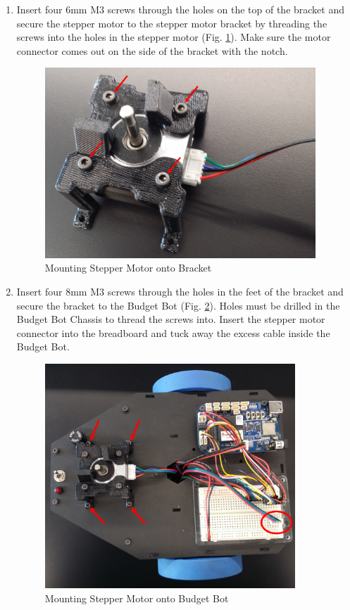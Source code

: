\begin{enumerate}[label = \textbf{Step \arabic*.}]
    \item Insert four 6mm M3 screws through the holes on the top of the bracket and secure the stepper motor to the stepper motor bracket by threading the screws into the holes in the stepper motor (Fig. \ref{fig:stepperAssembly}). Make sure the motor connector comes out on the side of the bracket with the notch.
    \begin{figure}[H]
        \centering
        \includegraphics[width=4in]{figs/img/assembly/05-stepperAssembly.png}
        \caption{Mounting Stepper Motor onto Bracket}
        \label{fig:stepperAssembly}
    \end{figure}
    \pagebreak

    \item Insert four 8mm M3 screws through the holes in the feet of the bracket and secure the bracket to the Budget Bot (Fig. \ref{fig:stepperMounting}). Holes must be drilled in the Budget Bot Chassis to thread the screws into. Insert the stepper motor connector into the breadboard and tuck away the excess cable inside the Budget Bot.
    \begin{figure}[H]
        \centering
        \includegraphics[width=3.7in]{figs/img/assembly/06-stepperMounting.png}
        \caption{Mounting Stepper Motor onto Budget Bot}
        \label{fig:stepperMounting}
    \end{figure}


\end{enumerate}
